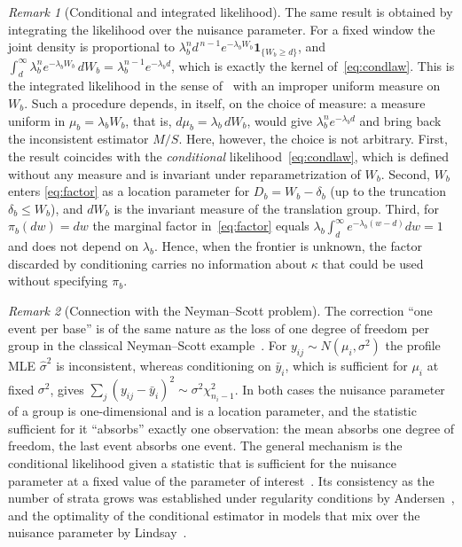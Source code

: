 \documentclass[11pt,a4paper]{article}
\theoremstyle{plain}
\theoremstyle{remark}
\newtheorem{remark}{Remark}
\begin{document}
\begin{remark}[Conditional and integrated likelihood]\label{rem:integrated}
The same result is obtained by integrating the likelihood over the nuisance
parameter. For a fixed window the joint density is proportional to
$\lambda_b^{n}d^{\,n-1}e^{-\lambda_bW_b}\mathbf 1_{\{W_b\ge d\}}$, and
$\int_d^\infty\lambda_b^{n}e^{-\lambda_bW_b}\,dW_b=\lambda_b^{n-1}e^{-\lambda_bd}$,
which is exactly the kernel of~\eqref{eq:condlaw}. This is the integrated
likelihood in the sense of~\cite{berger1999} with an improper uniform measure on
$W_b$. Such a procedure depends, in itself, on the choice of measure: a measure
uniform in $\mu_b=\lambda_bW_b$, that is, $d\mu_b=\lambda_b\,dW_b$, would give
$\lambda_b^{n}e^{-\lambda_bd}$ and bring back the inconsistent estimator $M/S$.
Here, however, the choice is not arbitrary. First, the result coincides with the
\emph{conditional} likelihood~\eqref{eq:condlaw}, which is defined without any
measure and is invariant under reparametrization of $W_b$. Second, $W_b$ enters
\eqref{eq:factor} as a location parameter for $D_b=W_b-\delta_b$ (up to the
truncation $\delta_b\le W_b$), and $dW_b$ is the invariant measure of the
translation group. Third, for $\pi_b(dw)=dw$ the
marginal factor in~\eqref{eq:factor} equals
$\lambda_b\int_d^\infty e^{-\lambda_b(w-d)}dw=1$ and does not depend on
$\lambda_b$. Hence, when the frontier is unknown, the factor discarded by
conditioning carries no information about $\kappa$ that could be used without
specifying $\pi_b$.
\end{remark}

\begin{remark}[Connection with the Neyman--Scott problem]\label{rem:neymanscott}
The correction ``one event per base'' is of the same nature as the loss of one
degree of freedom per group in the classical Neyman--Scott
example~\cite{neymanscott1948}. For $y_{ij}\sim N(\mu_i,\sigma^2)$ the profile
MLE $\hat\sigma^2$ is inconsistent, whereas conditioning on $\bar y_i$, which is
sufficient for $\mu_i$ at fixed $\sigma^2$, gives
$\sum_j(y_{ij}-\bar y_i)^2\sim\sigma^2\chi^2_{n_i-1}$. In both cases the nuisance
parameter of a group is one-dimensional and is a location parameter, and the
statistic sufficient for it ``absorbs'' exactly one observation: the mean absorbs
one degree of freedom, the last event absorbs one event. The general mechanism is
the conditional likelihood given a statistic that is sufficient for the nuisance
parameter at a fixed value of the parameter of
interest~\cite{kalbfleischsprott1970}. Its consistency as the number of strata
grows was established under regularity conditions by
Andersen~\cite{andersen1970}, and the optimality of the conditional estimator in
models that mix over the nuisance parameter by Lindsay~\cite{lindsay1980}.
\end{remark}
\end{document}
